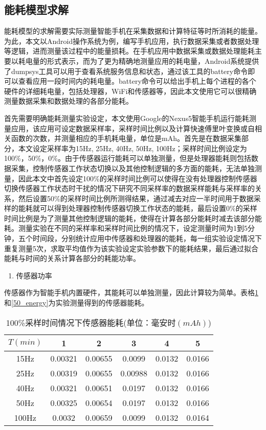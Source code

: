 \subsection{能耗模型求解}
\par 能耗模型的求解需要实际测量智能手机在采集数据和计算特征等时所消耗的能量。为此，本文以Android操作系统为例，编写手机应用，执行数据采集或者数据处理等逻辑，进而测量该过程中的能量损耗。在手机应用中数据采集或数据处理能耗主要以耗电量的形式表示，而为了更为精确地测量应用的耗电量，Android系统提供了dumpsys工具可以用于查看系统服务信息和状态，通过该工具的battery命令即可以查看应用一段时间内的耗电量。battery命令可以给出手机上每个进程的各个硬件的详细耗电量，包括处理器，WiFi和传感器等，因此本文使用它可以很精确测量数据采集和数据处理的各部分能耗。
\par 首先需要明确能耗测量实验设定，本文使用Google的Nexus5智能手机运行能耗测量应用，该应用可设定数据采样率，采样时间比例以及计算快速傅里叶变换或自相关函数的次数，并测量相应的手机耗电量，单位是mAh。首先是在数据采集部分，本文设定采样率为15Hz, 25Hz, 40Hz, 50Hz, 100Hz；采样时间比例设定为100\%，50\%，0\%。由于传感器运行能耗可以单独测量，但是处理器能耗则包括数据采集，控制传感器工作状态切换以及其他控制逻辑的多方面的能耗，无法单独测量，因此本文中首先设定100\%的采样时间比例可以使得在没有处理器控制传感器切换传感器工作状态时干扰的情况下研究不同采样率的数据采样能耗与采样率的关系，然后设置50\%的采样时间比例所测得结果，通过减去对应一半时间用于数据采样的能耗就可以得到处理器控制传感器切换工作状态的能耗，最后设置0\%的采样时间比例是为了测量其他控制逻辑的能耗，使得在计算各部分能耗时减去该部分能耗。测量实验在不同的采样率和采样时间比例的情况下，设定测量时间为1到5分钟，五个时间段，分别统计应用中传感器和处理器的能耗，每一组实验设定情况下重复测量5次，求取平均值作为该实验设定实验参数下的能耗结果，最后通过拟合能耗与时间的关系计算各部分的耗能功率。
\begin{enumerate}[(1)]
	\item 传感器功率
\end{enumerate}
\par 传感器作为智能手机内置硬件，其能耗可以单独测量，因此计算较为简单。表格\ref{100_energy}和\ref{50_energy}为实验测量得到的传感器能耗。

\begin{table}[htb]
    \centering
    \caption{100\%采样时间情况下传感器能耗(单位：毫安时$(mAh)$)}\label{100_energy}
    \begin{tabular}{cccccc}
    \toprule
     $T(min)$ & 1 & 2 & 3 & 4 & 5 \\
    \midrule
    15Hz & 0.00321 & 0.00655 & 0.0099 & 0.0132 & 0.0166 \\
    25Hz & 0.00319 & 0.00655 & 0.00988 & 0.0132 & 0.0166 \\
    40Hz & 0.00321 & 0.00651 & 0.0197 & 0.0132 & 0.0166 \\
    50Hz & 0.00325 & 0.00654 & 0.0197 & 0.0132 & 0.0166 \\
    100Hz & 0.0032 & 0.00659 & 0.0099 & 0.0132 & 0.0164 \\
    \bottomrule
    \end{tabular}
 \end{table}

